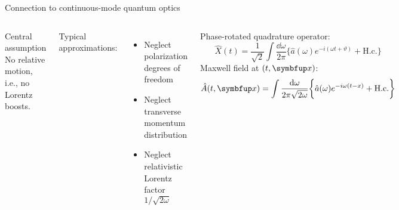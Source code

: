\documentclass[aspectratio=169,usenames,dvipsnames]{beamer}
\begin{document}
	\begin{frame}{Connection to continuous-mode quantum optics}
		\begin{columns}[c, onlytextwidth]
			\begin{block}{Central assumption}
				No relative motion, i.e., no Lorentz boosts.
			\end{block}

			Typical approximations:
			\begin{itemize}
				\item Neglect polarization degrees of freedom
				\item Neglect transverse momentum distribution
				\item Neglect relativistic Lorentz factor $1/\sqrt{2\omega}$
			\end{itemize}

			Phase-rotated quadrature operator:
			\begin{equation}
				\hat{X}(t)
				=
				\frac{1}{\sqrt{2}}
				\int\frac{\dd{\omega}}{2\pi}
				\biggl\{
					\hat{a}(\omega)
					e^{-i(\omega t+\vartheta)}
					+
					\text{H.c.}
				\biggr\}
			\end{equation}
			Maxwell field at $(t,\vb{x})$:
			\begin{equation}
				\hat{A}(t,\vb{x})
				=
				\int\frac{\dd{\omega}}{2\pi\sqrt{2\omega}}
				\biggl\{
					\hat{a}(\omega)
					e^{-i\omega(t-x)}
					+
					\text{H.c.}					
				\biggr\}
			\end{equation}
		\end{columns}
	\end{frame}
	
\end{document}
